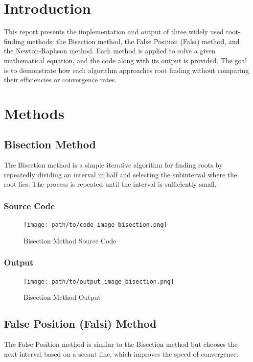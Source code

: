 \documentclass{scrreprt}
\begin{document}
\begin{titlepage}
    \date{\today}
    \vfill
\end{titlepage}

\section{Introduction}
This report presents the implementation and output of three widely used root-finding methods: the Bisection method, the False Position (Falsi) method, and the Newton-Raphson method. Each method is applied to solve a given mathematical equation, and the code along with its output is provided. The goal is to demonstrate how each algorithm approaches root finding without comparing their efficiencies or convergence rates.

\section{Methods}

\subsection{Bisection Method}
The Bisection method is a simple iterative algorithm for finding roots by repeatedly dividing an interval in half and selecting the subinterval where the root lies. The process is repeated until the interval is sufficiently small.

\subsubsection{Source Code}
\begin{figure}[h]
    \centering
    \texttt{[image: path/to/code\_image\_bisection.png]}
    \caption{Bisection Method Source Code}
\end{figure}

\subsubsection{Output}
\begin{figure}[h]
    \centering
    \texttt{[image: path/to/output\_image\_bisection.png]}
    \caption{Bisection Method Output}
\end{figure}

\subsection{False Position (Falsi) Method}
The False Position method is similar to the Bisection method but chooses the next interval based on a secant line, which improves the speed of convergence.
\end{document}
